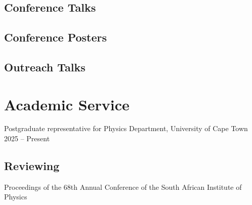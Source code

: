 \documentclass[11pt,letter,sans]{moderncv}
\begin{document}
	\subsection{Conference Talks}
	\leavevmode\printbibliography[subtype=conferencetalk, heading=none, resetnumbers=true]
	\subsection{Conference Posters}
	\leavevmode\printbibliography[subtype=conferenceposter, heading=none, resetnumbers=true]
	\subsection{Outreach Talks}
	\leavevmode\printbibliography[subtype=othertalk, heading=none, resetnumbers=true]



\section{Academic Service}
      Postgraduate representative for Physics Department, University of Cape Town
    \hfill 2025 -- Present \\

\subsection{Reviewing}
Proceedings of the 68th Annual Conference of the South African Institute of Physics \\
\end{document}
